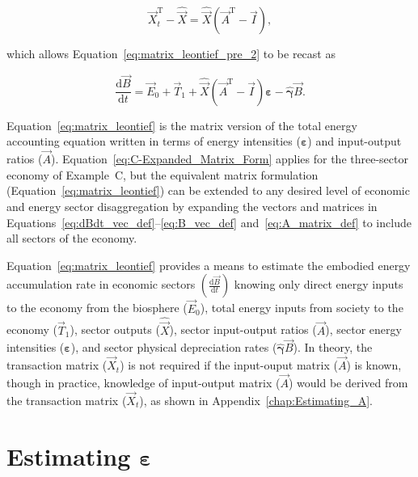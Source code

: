 \begin{equation} \label{eq:Xdifference1}
	\vec{X}_{t}^{\mathrm{T}} 
	- \hat{\vec{X}} 
	= \hat{\vec{X}} (\vec{A}^{\mathrm{T}} - \vec{I}),
\end{equation}

\noindent{}which allows Equation~\ref{eq:matrix_leontief_pre_2}
to be recast as

\begin{equation} \label{eq:matrix_leontief}
	\frac{\mathrm{d}\vec{B}}{\mathrm{d}t} 
	= \vec{E}_{0}
	+ \vec{T}_{1}
	+ \hat{\vec{X}} (\vec{A}^{\mathrm{T}} - \vec{I})\bm{\varepsilon} 
	- \hat{\bm{\gamma}}\vec{B}.
\end{equation}

\noindent{}Equation~\ref{eq:matrix_leontief} is the matrix version 
of the total energy accounting equation
written in terms of energy intensities ($\bm{\varepsilon}$)
and input-output ratios ($\vec{A}$).
Equation~\ref{eq:C-Expanded_Matrix_Form} applies 
for the three-sector economy of Example~C, 
but the equivalent matrix formulation (Equation~\ref{eq:matrix_leontief}) 
can be extended to any desired level 
of economic and energy sector disaggregation 
by expanding the vectors and matrices in 
Equations~\ref{eq:dBdt_vec_def}--\ref{eq:B_vec_def}
and~\ref{eq:A_matrix_def} to include
all sectors of the economy.~\cite{Casler1984,Bullard:1978vd}

Equation~\ref{eq:matrix_leontief} provides a means to 
estimate the embodied energy accumulation rate
in economic sectors $\left(\frac{\mathrm{d}\vec{B}}{\mathrm{d}t}\right)$ 
knowing only 
direct energy inputs to the economy from the biosphere ($\vec{E}_{0}$), 
total energy inputs from society to the economy ($\vec{T}_{1}$),
sector outputs ($\hat{\vec{X}}$), 
sector input-output ratios ($\vec{A}$), 
sector energy intensities ($\bm{\varepsilon}$), 
and sector physical depreciation rates ($\hat{\bm{\gamma}}\vec{B}$). 
In theory, the transaction matrix ($\vec{X}_{t}$) is not required 
if the input-ouput matrix ($\vec{A}$) is known, 
though in practice, 
knowledge of input-output matrix ($\vec{A}$) 
would be derived from the transaction matrix ($\vec{X}_{t}$),
as shown in Appendix~\ref{chap:Estimating_A}.


\section{Estimating $\bm{\varepsilon}$}
\label{sec:estimating_epsilon-intensity_chapter}

